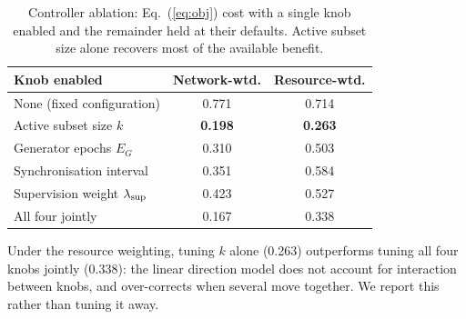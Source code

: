 \begin{table}[!t]
\centering
\caption{Controller ablation: Eq.~(\ref{eq:obj}) cost with a single knob
enabled and the remainder held at their defaults. Active subset size alone
recovers most of the available benefit.}
\label{tab:knobs}
\begin{tabular}{lcc}
\toprule
Knob enabled & Network-wtd. & Resource-wtd. \\
\midrule
None (fixed configuration)            & 0.771 & 0.714 \\
Active subset size $k$                & \textbf{0.198} & \textbf{0.263} \\
Generator epochs $E_G$                & 0.310 & 0.503 \\
Synchronisation interval              & 0.351 & 0.584 \\
Supervision weight $\lambda_{\rm sup}$ & 0.423 & 0.527 \\
All four jointly                      & 0.167 & 0.338 \\
\bottomrule
\end{tabular}
\begin{flushleft}\footnotesize
Under the resource weighting, tuning $k$ alone (0.263) outperforms tuning all
four knobs jointly (0.338): the linear direction model does not account for
interaction between knobs, and over-corrects when several move together. We
report this rather than tuning it away.
\end{flushleft}
\end{table}
